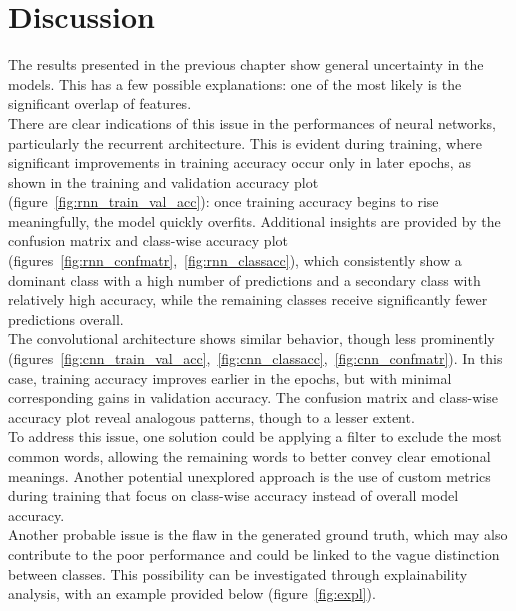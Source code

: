 \chapter*{Discussion}
\label{ch:discussion}
The results presented in the previous chapter show general
uncertainty in the models. This has a few possible explanations:
one of the most likely is the significant overlap of features.\\

There are clear indications of this issue in the performances of neural networks,
particularly the recurrent architecture. This is evident during training, where
significant improvements in training accuracy occur only in later epochs, as shown
in the training and validation accuracy plot (figure~\ref{fig:rnn_train_val_acc}):
once training accuracy begins to rise meaningfully, the model quickly overfits.
Additional insights are provided by the confusion matrix and class-wise accuracy
plot (figures~\ref{fig:rnn_confmatr},~\ref{fig:rnn_classacc}), which consistently
show a dominant class with a high number of predictions and a secondary class
with relatively high accuracy, while the remaining classes receive significantly
fewer predictions overall.\\

The convolutional architecture shows similar behavior, though less prominently
(figures~\ref{fig:cnn_train_val_acc},~\ref{fig:cnn_classacc},~\ref{fig:cnn_confmatr}).
In this case, training accuracy improves earlier in the epochs,
but with minimal corresponding gains in validation accuracy.
The confusion matrix and class-wise accuracy plot reveal analogous patterns, though
to a lesser extent.\\

To address this issue, one solution could be applying a filter to exclude the most
common words, allowing the remaining words to better convey clear emotional
meanings. Another potential unexplored approach is the use of custom
metrics during training that focus on class-wise accuracy instead of overall model
accuracy.\\

Another probable issue is the flaw in the generated ground truth, which may
also contribute to the poor performance and could be linked to the vague distinction
between classes.
This possibility can be investigated through explainability analysis, with an
example provided below (figure~\ref{fig:expl}).

